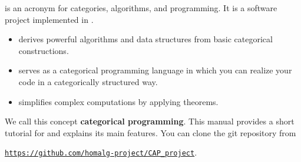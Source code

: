 \CapPkg is an acronym for categories, algorithms, and programming.
It is a software project implemented in \GAP.
\begin{itemize}
  \item \CapPkg derives powerful algorithms and data structures from basic categorical constructions.
  \item \CapPkg serves as a categorical programming language in which you can realize your
  code in a categorically structured way.
  \item \CapPkg simplifies complex computations
  by applying theorems.
 \end{itemize}
We call this concept \textbf{categorical programming}. 
This manual provides a short tutorial for \CapPkg and explains
its main features.
You can clone the \CapPkg git repository from
\begin{center}
 \href{https://github.com/homalg-project/CAP_project}{\texttt{https://github.com/homalg-project/CAP\_project}}.
\end{center}
